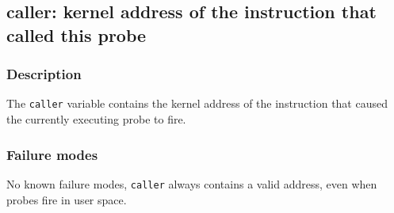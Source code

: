 \clearpage
{}
{}
\label{vars:caller}
\subsection*{caller: kernel address of the instruction that called
  this probe}

\subsubsection*{Description}

The \verb|caller| variable contains the kernel address of the
instruction that caused the currently executing probe to fire.

\subsubsection*{Failure modes}

No known failure modes, \verb|caller| always contains a valid address,
even when probes fire in user space.
